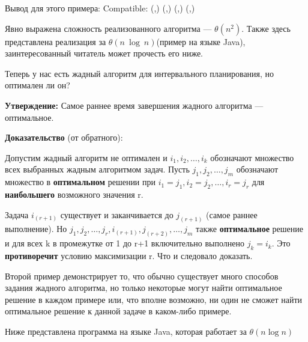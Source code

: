 \vspace{\baselineskip}
Вывод для этого примера: Compatible: ({\color{Purple}{1}},{\color{Purple}{3}}) ({\color{Purple}{4}},{\color{Purple}{5}}) ({\color{Purple}{6}},{\color{Purple}{8}}) ({\color{Purple}{9}},{\color{Purple}{10}})

\vspace{\baselineskip}
Явно выражена сложность реализованного алгоритма --- $\theta(n^2)$. Также здесь представлена реализация за $\theta(n \ \log \ n)$(пример на языке Java), заинтересованный читатель может прочесть его ниже.

\vspace{\baselineskip}
Теперь у нас есть жадный алгоритм для интервального планирования, но оптимален ли он?

\vspace{\baselineskip}
\textbf{Утверждение:} Самое раннее время завершения жадного алгоритма --- оптимальное.

\vspace{\baselineskip}
\textbf{Доказательство} (от обратного):

\vspace{\baselineskip}
Допустим жадный алгоритм не оптимален и $i_1, i_2, \ldots, i_k$ обозначают множество всех выбранных жадным алгоритмом задач. Пусть $j_1, j_2, \ldots, j_m$ обозначают множество в \textbf{оптимальном} решении при $i_1 = j_1, i_2 = j_2, \ldots, i_r = j_r$ для \textbf{наибольшего} возможного значения r.

\vspace{\baselineskip}
Задача $i_{(r+1)}$ существует и заканчивается до $j_{(r+1)}$ (самое раннее выполнение). Но $j_1, j_2, \ldots, j_r, i_{(r+1)},j_{(r+2)}, \ldots, j_m$ также \textbf{оптимальное} решение и для всех k в промежутке от 1 до r+1 включительно выполнено $j_k = i_k$. Это \textbf{противоречит} условию максимизации r. Что и следовало доказать.

\vspace{\baselineskip}
Второй пример демонстрирует то, что обычно существует много способов задания жадного алгоритма, но только некоторые могут найти оптимальное решение в каждом примере или, что вполне возможно, ни один не сможет найти оптимальное решение к данной задаче в каком-либо примере.

\vspace{\baselineskip}
Ниже представлена программа на языке Java, которая работает за $\theta(n \log n)$

